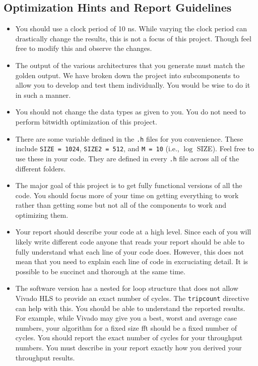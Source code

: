 \subsection{Optimization Hints and Report Guidelines}

\begin{itemize}
\item You should use a clock period of 10 ns. While varying the clock period can drastically change the results, this is not a focus of this project. Though feel free to modify this and observe the changes. 
\item The output of the various architectures that you generate must match the golden output. We have broken down the project into subcomponents to allow you to develop and test them individually. You would be wise to do it in such a manner.
\item You should not change the data types as given to you. You do not need to perform bitwidth optimization of this project.
\item There are some variable defined in the \texttt{.h} files for you convenience. These include \texttt{SIZE = 1024}, \texttt{SIZE2 = 512}, and \texttt{M = 10} (i.e., $\log$ SIZE). Feel free to use these in your code. They are defined in every \texttt{.h} file across all of the different folders.
\item The major goal of this project is to get fully functional versions of all the code. You should focus more of your time on getting everything to work rather than getting some but not all of the components to work and optimizing them.
\item Your report should describe your code at a high level. Since each of you will likely write different code anyone that reads your report should be able to fully understand what each line of your code does. However, this does not mean that you need to explain each line of code in excruciating detail. It is possible to be succinct and thorough at the same time.
\item The software version has a nested for loop structure that does not allow Vivado HLS to provide an exact number of cycles. The \texttt{tripcount} directive can help with this. You should be able to understand the reported results. For example, while Vivado may give you a best, worst and average case numbers, your algorithm for a fixed size \gls{fft} should be a fixed number of cycles. You should report the exact number of cycles for your throughput numbers. You must describe in your report exactly how you derived your throughput results.

\end{itemize}
